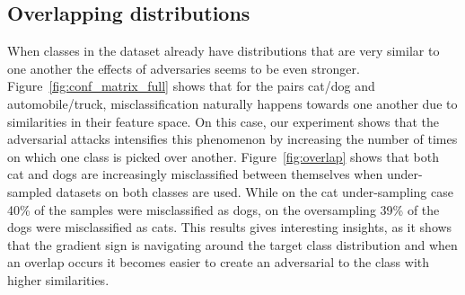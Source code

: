 \documentclass[runningheads,a4paper]{llncs}
\begin{document}
\subsection{Overlapping distributions}

When classes in the dataset already have distributions that are very similar to one another the effects of adversaries seems to be even stronger. Figure~\ref{fig:conf_matrix_full} shows that for the pairs cat/dog and automobile/truck, misclassification naturally happens towards one another due to similarities in their feature space. On this case, our experiment shows that the adversarial attacks intensifies this phenomenon by increasing the number of times on which one class is picked over another. Figure~\ref{fig:overlap} shows that both cat and dogs are increasingly misclassified between themselves when under-sampled datasets on both classes are used. While on the cat under-sampling case 40\% of the samples were misclassified as dogs, on the oversampling 39\% of the dogs were misclassified as cats. This results gives interesting insights, as it shows that the gradient sign is navigating around the target class distribution and when an overlap occurs it becomes easier to create an adversarial to the class with higher similarities.
\end{document}

